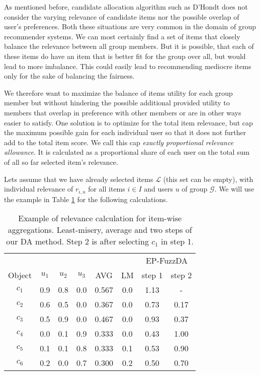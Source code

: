 As mentioned before, candidate allocation algorithm such as D'Hondt does not consider the varying relevance of candidate items nor the possible overlap of user's preferences. Both these situations are very common in the domain of group recommender systems. We can most certainly find a set of items that closely balance the relevance between all group members. But it is possible, that each of these items do have an item that is better fit for the group over all, but would lead to more imbalance. This could easily lead to recommending mediocre items only for the sake of balancing the fairness.

We therefore want to maximize the balance of items utility for each group member but without hindering the possible additional provided utility to members that overlap in preference with other members or are in other ways easier to satisfy. One solution is to optimize for the total item relevance, but cap the maximum possible gain for each individual user so that it does not further add to the total item score. We call this cap \textit{exactly proportional relevance allowance}. It is calculated as a proportional share of each user on the total sum of all so far selected item's relevance.


Lets assume that we have already selected items $\mathcal{L}$ (this set can be empty), with individual relevance of $r_{i,u}$ for all items $i \in I$ and users $u$ of group $\mathcal{G}$. We will use the example in Table \ref{table:6.2_relevance_example} for the following calculations.

\begin{table}[!ht]
    \centering
    \begin{tabular}{c | c c c | c c c c}
               &       &       &       &      &    & \multicolumn{2}{c}{EP-FuzzDA} \\
        Object & $u_1$ & $u_2$ & $u_3$ & AVG  & LM & step 1 & step 2\\
        \hline
        $c_1$ & 0.9 & 0.8 & 0.0 & 0.567 & 0.0 & 1.13 & - \\
        $c_2$ & 0.6 & 0.5 & 0.0 & 0.367 & 0.0 & 0.73 & 0.17 \\
        $c_3$ & 0.5 & 0.9 & 0.0 & 0.467 & 0.0 & 0.93 & 0.37 \\
        $c_4$ & 0.0 & 0.1 & 0.9 & 0.333 & 0.0 & 0.43 & 1.00 \\
        $c_5$ & 0.1 & 0.1 & 0.8 & 0.333 & 0.1 & 0.53 & 0.90 \\
        $c_6$ & 0.2 & 0.0 & 0.7 & 0.300 & 0.2 & 0.50  & 0.70 \\
    \end{tabular}
    \caption[Example of relevance calculation for item-wise aggregations]{Example of relevance calculation for item-wise aggregations. Least-misery, average and two steps of our DA method. Step 2 is after selecting $c_1$ in step 1.}
    \label{table:6.2_relevance_example}
\end{table}


